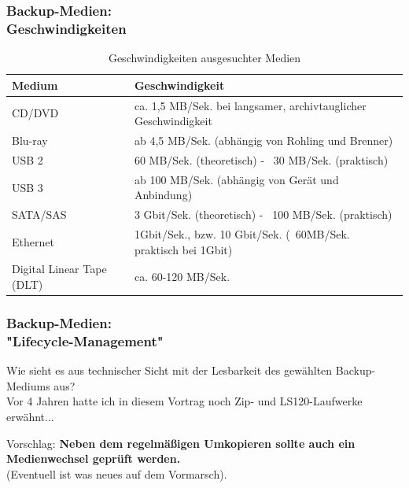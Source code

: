 \begin{frame}
  \frametitle{Backup-Medien:\\Geschwindigkeiten}
  \begin{tiny}
  \begin{table}
    \begin{tabular}{l l}
      \toprule        %
      \textbf{Medium} & \textbf{Geschwindigkeit}\\
      \midrule        %
      CD/DVD & ca. 1,5 MB/Sek. bei langsamer, archivtauglicher Geschwindigkeit \\
      \midrule
      Blu-ray & ab 4,5 MB/Sek. (abhängig von Rohling und Brenner) \\
      \midrule
      USB 2 & 60 MB/Sek. (theoretisch) - ~30 MB/Sek. (praktisch) \\
      \midrule
      USB 3 & ab 100 MB/Sek. (abhängig von Gerät und Anbindung) \\
      \midrule
      SATA/SAS & 3 Gbit/Sek. (theoretisch) - ~100 MB/Sek. (praktisch) \\
      \midrule
      Ethernet & 1Gbit/Sek., bzw. 10 Gbit/Sek. (~60MB/Sek. praktisch bei 1Gbit) \\
      \midrule
      Digital Linear Tape (DLT) & ca. 60-120 MB/Sek. \\
      \bottomrule       %
    \end{tabular}
    \caption{Geschwindigkeiten ausgesuchter Medien}
  \end{table}
  \end{tiny}
\end{frame}

\begin{frame}
  \frametitle{Backup-Medien:\\"Lifecycle-Management"}
  \pause
  Wie sieht es aus technischer Sicht mit der Lesbarkeit des gewählten Backup-Mediums aus?\\
  \pause
  Vor 4 Jahren hatte ich in diesem Vortrag noch Zip- und LS120-Laufwerke erwähnt...\\
  \pause
  \begin{alertblock}{Vorschlag:}
      {\bf Neben dem regelmäßigen Umkopieren sollte auch ein Medienwechsel geprüft werden.}\\(Eventuell ist was neues auf dem Vormarsch).
    \end{alertblock}
\end{frame}

